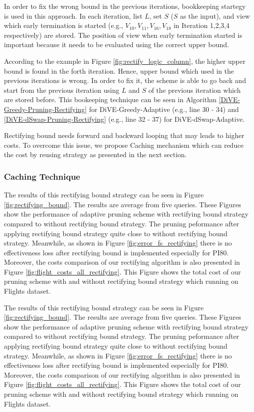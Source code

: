 \documentclass{article}
\begin{document}
In order to fix the wrong bound in the previous iterations, bookkeeping startegy is used in this approach. In each iteration, list $L$, set $S$ ($S$ as the input), and view which early termination is started (e.g., $V_{10}, V_{11}, V_{16}, V_{18}$ in Iteration 1,2,3,4 respectively) are stored. The position of view when early termination started is important because it needs to be evaluated using the correct upper bound. 

According to the example in Figure \ref{fig:rectify_logic_column}, the higher upper bound is found in the forth iteration. Hence, upper bound which used in the previous iterations is wrong. In order to fix it, the scheme is able to go back and start from the previous iteration using $L$ and $S$ of the previous iteration which are stored before. This bookeeping technique can be seen in Algorithm \ref{DiVE-Greedy-Pruning-Rectifying} for DiVE-Greedy-Adaptive (e.g., line 30 - 34) and \ref{DiVE-dSwap-Pruning-Rectifying} (e.g., line 32 - 37) for DiVE-dSwap-Adaptive.

Rectifying bound needs forward and backward looping that may leads to higher costs. To overcome this issue, we propose Caching mechanism which can reduce the cost by reusing strategy as presented in the next section. 

\subsubsection{Caching Technique}
The results of this rectifying bound strategy can be seen in Figure \ref{fig:rectifying_bound}. The results are average from five queries. These Figures show the performance of adaptive pruning scheme with rectifying bound strategy compared to without rectifying bound strategy. The pruning peformance after applying rectifying bound strategy quite close to without rectifying bound strategy. Meanwhile, as shown in Figure \ref{fig:error_fs_rectifying} there is no effectiveness loss after rectifying bound is implemented especially for PI80. Moreover, the costs comparison of our rectifying algorithm is also presented in Figure \ref{fig:flight_costs_all_rectifying}. This Figure shows the total cost of our pruning scheme with and without rectifying bound strategy which running on Flights dataset. 

The results of this rectifying bound strategy can be seen in Figure \ref{fig:rectifying_bound}. The results are average from five queries. These Figures show the performance of adaptive pruning scheme with rectifying bound strategy compared to without rectifying bound strategy. The pruning peformance after applying rectifying bound strategy quite close to without rectifying bound strategy. Meanwhile, as shown in Figure \ref{fig:error_fs_rectifying} there is no effectiveness loss after rectifying bound is implemented especially for PI80. Moreover, the costs comparison of our rectifying algorithm is also presented in Figure \ref{fig:flight_costs_all_rectifying}. This Figure shows the total cost of our pruning scheme with and without rectifying bound strategy which running on Flights dataset. 
\end{document}
